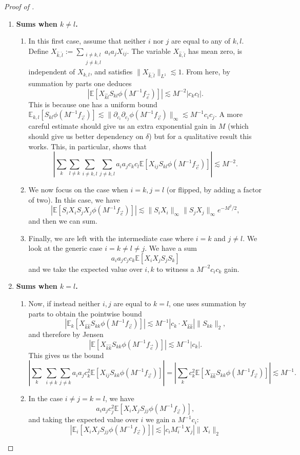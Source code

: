\documentclass{inprogress}
\begin{document}
\begin{proof}[Proof of ]
\begin{enumerate}
\item\textbf{Sums when $k\neq l$.}
\begin{enumerate}
    \item In this first case, assume that neither $i$ nor $j$ are equal to any of $k,l$. Define $X_{\hat k,\hat l}:= \sum_{\substack{i\neq k,l\\j\neq k,l}} a_{i} a_jX_{ij}$. The variable $X_{\hat k,\hat l}$ has mean zero, is independent of $X_{k,l}$, and satisfies $\|X_{\hat k,\hat l}\|_{L^1}\lesssim 1$. From here, by summation by parts one deduces
    $$| \mathbb E[X_{\hat k\hat l}S_{kl}\phi(M^{-1}f_{\vec c})]| \lesssim M^{-2}|c_k c_l|.$$
    This is because one has a uniform bound $\mathbb E_{k,l}[S_{kl}\phi(M^{-1}f_{\vec c})]\lesssim \|\partial_{c_i}\partial_{c_j} \phi(M^{-1}f_{\vec c})\|_\infty \lesssim M^{-1} c_i c_j$. A more careful estimate should give us an extra exponential gain in $M$ (which should give us better dependency on $\delta$) but for a qualitative result this works. This, in particular, shows that 
    $$
    \left|\sum_{k}\sum_{l\neq k} \sum_{i\neq k,l}\sum_{j\neq k,l} a_i a_j c_k c_l \mathbb E[X_{ij}S_{kl}\phi(M^{-1}f_{\vec c})] \right| \lesssim M^{-2}.
    $$
    \item We now focus on the case when $i=k, j=l$ (or flipped, by adding a factor of two). In this case, we have
    $$
    |\mathbb E[S_i X_i S_j X_j\phi(M^{-1}f_{\vec c})]|
    \lesssim 
    \|S_i X_i\|_\infty \|S_j X_j\|_\infty e^{-M^2/2},
    $$ 
    and then we can sum.
    \item Finally, we are left with the intermediate case where $i=k$ and $j\neq l$. We look at the generic case $i=k\neq l \neq j$. We have a sum
    $$
    a_i a_j c_j c_k \mathbb E[X_i X_j S_j S_k]
    $$
    and we take the expected value over $i,k$ to witness a $M^{-2}c_ic_k$ gain. 
\end{enumerate}
\item \textbf{Sums when $k=l$.}
\begin{enumerate}
    \item Now, if instead neither $i,j$ are equal to $k=l$, one uses summation by parts to obtain the pointwise bound 
    $$
     | \mathbb E_k [X_{\hat k\hat k}S_{kk}\phi(M^{-1}f_{\vec c})]| \lesssim M^{-1}|c_k \cdot X_{\hat k\hat k}| \|S_{kk}\|_2,
    $$
    and therefore by Jensen
    $$| \mathbb E[X_{\hat k\hat k}S_{kk}\phi(M^{-1}f_{\vec c})]| \lesssim M^{-1}|c_k|.$$
 This gives us the bound 
    $$
    \left|\sum_{k}\ \sum_{i\neq k}\sum_{j\neq k} a_i a_j c_k^2 \mathbb E[X_{ij}S_{kk}\phi(M^{-1}f_{\vec c})] \right|
    =
    \left|\sum_{k} c_k^2 \mathbb E[X_{\hat k \hat k}S_{kk}\phi(M^{-1}f_{\vec c})] \right|
    \lesssim M^{-1}.
    $$
    \item  In the case $i \neq j = k = l$,  we have
    $$
    a_i a_j c_j^2 \mathbb E[X_{i} X_j S_{jj}\phi(M^{-1}f_{\vec c})],
    $$
    and taking the expected value over $i$ we gain a $M^{-1}c_i$:
    $$
    |\mathbb E_i[X_{i} X_j S_{jj}\phi(M^{-1}f_{\vec c})]| \lesssim |c_i M_i^{-1} X_j|  \|X_i\|_2
    $$
    

\end{enumerate}
\end{enumerate}
\end{proof}
\end{document}
